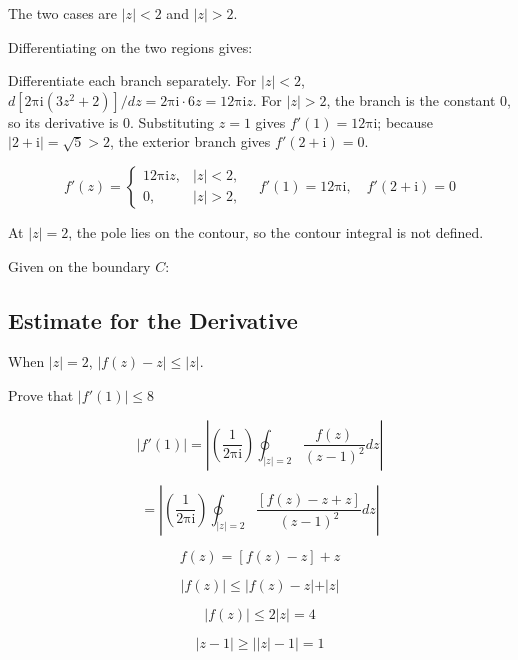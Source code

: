 \documentclass[11pt,a4paper]{article}
\theoremstyle{definition}
\theoremstyle{plain}
\begin{document}
The two cases are $\vert{}z\vert{} < 2$ and $\vert{}z\vert{} > 2$.

Differentiating on the two regions gives:

Differentiate each branch separately. For $\vert{}z\vert{} < 2$, $d[2\mathrm{\pi}\mathrm{i}(3z^{2} + 2)]/dz = 2\mathrm{\pi}\mathrm{i} \cdot 6z = 12\mathrm{\pi}\mathrm{i}z$. For $\vert{}z\vert{} > 2$, the branch is the constant 0, so its derivative is 0. Substituting $z = 1$ gives $f'(1) = 12\mathrm{\pi}\mathrm{i}$; because $\vert{}2 + \mathrm{i}\vert{} = \sqrt{5} > 2$, the exterior branch gives $f'(2 + \mathrm{i}) = 0$.

\begin{equation}
f'(z) = \begin{cases} 12\mathrm{\pi}\mathrm{i}z, & \vert{}z\vert{} < 2, \\ 0, & \vert{}z\vert{} > 2, \end{cases}\quad f'(1) = 12\mathrm{\pi}\mathrm{i}, \quad f'(2 + \mathrm{i}) = 0
\end{equation}

At $\vert{}z\vert{} = 2$, the pole lies on the contour, so the contour integral is not defined.

Given on the boundary $C$:

\subsection{Estimate for the Derivative}

When $\vert{}z\vert{} = 2$,   $\vert{}f(z) - z\vert{} \le\vert{}z\vert{}$.

Prove that $\vert{}f'(1)\vert{} \le 8$

\begin{equation}
\vert{}f'(1)\vert{} = \left\vert{}\left(\frac{1}{2\mathrm{\pi}\mathrm{i}}\right)\oint_{\vert{}z\vert{} = 2}\frac{f(z)}{(z - 1)^{2}}dz\right\vert{}
\end{equation}

\[
= \left\vert{}\left(\frac{1}{2\mathrm{\pi}\mathrm{i}}\right)\oint_{\vert{}z\vert{} = 2}\frac{[f(z) - z + z]}{(z - 1)^{2}}dz\right\vert{}
\]

\[
f(z) = [f(z) - z] + z
\]

\[
\vert{}f(z)\vert{} \le\vert{}f(z) - z\vert{} + \vert{}z\vert{}
\]

\[
\vert{}f(z)\vert{} \le 2\vert{}z\vert{} = 4
\]

\[
\vert{}z - 1\vert{} \ge\vert{}\vert{}z\vert{} - 1\vert{} = 1
\]
\end{document}
